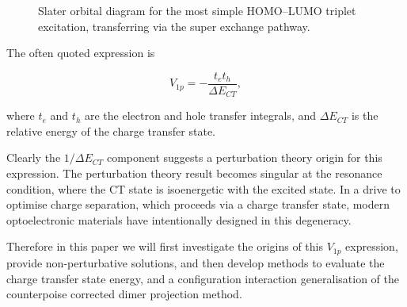 \documentclass[aps,physrev,reprint,superscriptaddress,nofootinbib,amsmath,amssymb,a4paper]{revtex4-2}
\begin{document}
\begin{figure}[htbp]
{ }

\caption{Slater orbital diagram for the most simple HOMO--LUMO triplet excitation, transferring via the super exchange pathway.}
    \label{fig:superexchange_slater_diagram}
\end{figure}


The often quoted expression is

\begin{equation}
    V_{1p} = - \frac{t_e t_h}{\Delta E_{CT}}, 
\end{equation}

where $t_e$ and $t_h$ are the electron and hole transfer integrals, and $\Delta E_{CT}$ is the relative energy of the charge transfer state. 

Clearly the $1/\Delta E_{CT}$ component suggests a perturbation theory origin for this expression. 
The perturbation theory result becomes singular at the resonance condition, where the CT state is isoenergetic with the excited state. 
In a drive to optimise charge separation, which proceeds via a charge transfer state, modern optoelectronic materials have intentionally designed in this degeneracy. 

Therefore in this paper we will first investigate the origins of this $V_{1p}$ expression, provide non-perturbative solutions, and then develop methods to evaluate the charge transfer state energy, and a configuration interaction generalisation of the counterpoise corrected dimer projection method. 
\end{document}
